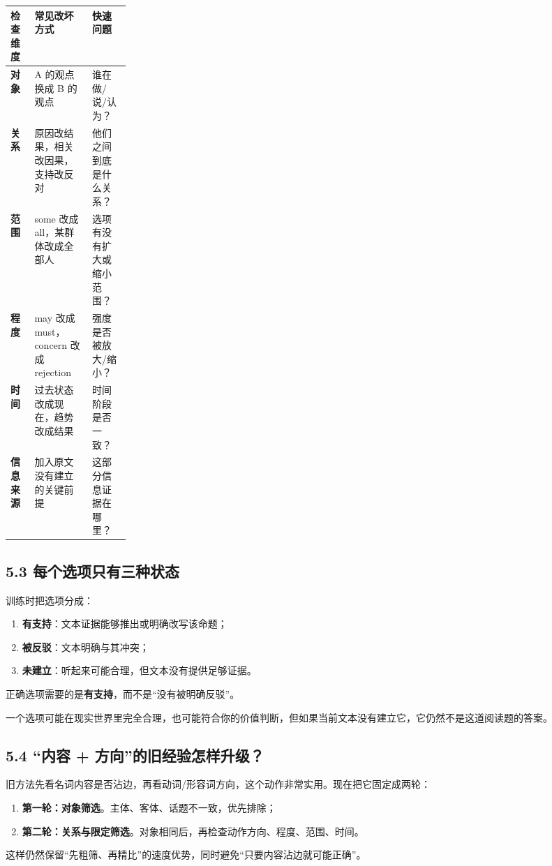 \documentclass[11pt,a4paper]{ctexart}
\newcommand{\kw}[1]{\textbf{#1}}
\begin{document}
\begin{center}
\small
\begin{tabularx}{\linewidth}{>{\bfseries}p{0.20\linewidth} X X}
\toprule
检查维度 & 常见改坏方式 & 快速问题 \\
\midrule
对象 & A 的观点换成 B 的观点 & 谁在做/说/认为？ \\
关系 & 原因改结果，相关改因果，支持改反对 & 他们之间到底是什么关系？ \\
范围 & some 改成 all，某群体改成全部人 & 选项有没有扩大或缩小范围？ \\
程度 & may 改成 must，concern 改成 rejection & 强度是否被放大/缩小？ \\
时间 & 过去状态改成现在，趋势改成结果 & 时间阶段是否一致？ \\
信息来源 & 加入原文没有建立的关键前提 & 这部分信息证据在哪里？ \\
\bottomrule
\end{tabularx}
\end{center}

\subsection{5.3 每个选项只有三种状态}
训练时把选项分成：
\begin{enumerate}
  \item \kw{有支持}：文本证据能够推出或明确改写该命题；
  \item \kw{被反驳}：文本明确与其冲突；
  \item \kw{未建立}：听起来可能合理，但文本没有提供足够证据。
\end{enumerate}

正确选项需要的是\kw{有支持}，而不是“没有被明确反驳”。

\begin{warn}
一个选项可能在现实世界里完全合理，也可能符合你的价值判断，但如果当前文本没有建立它，它仍然不是这道阅读题的答案。
\end{warn}

\subsection{5.4 “内容 + 方向”的旧经验怎样升级？}
旧方法先看名词内容是否沾边，再看动词/形容词方向，这个动作非常实用。现在把它固定成两轮：
\begin{enumerate}
  \item \kw{第一轮：对象筛选}。主体、客体、话题不一致，优先排除；
  \item \kw{第二轮：关系与限定筛选}。对象相同后，再检查动作方向、程度、范围、时间。
\end{enumerate}
这样仍然保留“先粗筛、再精比”的速度优势，同时避免“只要内容沾边就可能正确”。
\end{document}
